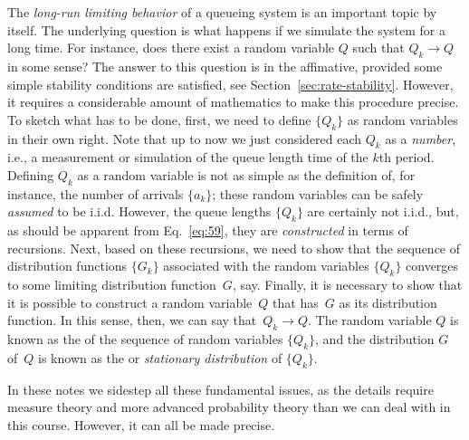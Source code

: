 The \emph{long-run limiting behavior} of a queueing system is an
important topic by itself. The underlying question is what happens if
we simulate the system for a long time. For instance, does there exist
a random variable $Q$ such that $Q_k\to Q$ in some sense? The answer
to this question is in the affimative, provided some simple stability
conditions are satisfied, see
Section~\ref{sec:rate-stability}. However, it requires a considerable
amount of mathematics to make this procedure precise. To sketch what
has to be done, first, we need to define $\{Q_k\}$ as random variables
in their own right. Note that up to now we just considered each $Q_k$
as a \emph{number}, i.e., a measurement or simulation of the queue
length time of the $k$th period. Defining $Q_k$ as a random variable
is not as simple as the definition of, for instance, the number of
arrivals $\{a_k\}$; these random variables can be safely
\emph{assumed} to be i.i.d. However, the queue lengths $\{Q_k\}$ are
certainly not i.i.d., but, as should be apparent from
Eq.~\eqref{eq:59}, they are \emph{constructed} in terms of
recursions. Next, based on these recursions, we need to show that the
sequence of distribution functions $\{G_k\}$ associated with the
random variables $\{Q_k\}$ converges to some limiting distribution
function~$G$, say. Finally, it is necessary to show that it is
possible to construct a random variable~$Q$ that has~$G$ as its
distribution function.  In this sense, then, we can say
that~$Q_k \to Q$. The random variable $Q$ is known as the
 of the sequence of random variables
$\{Q_k\}$, and the distribution $G$ of~$Q$ is known as the
 or \emph{stationary distribution} of $\{Q_k\}$.

In these notes we sidestep all these fundamental issues, as the
details require measure theory and more advanced probability theory
than we can deal with in this course. However, it can all be made
precise. 

